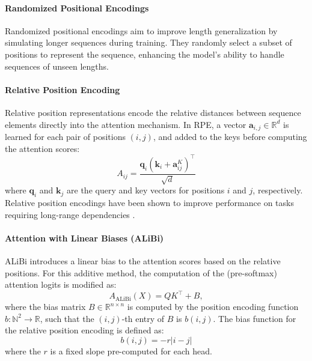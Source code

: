 \paragraph{Randomized Positional Encodings}\label{subsec:random_pos_enc}
Randomized positional encodings \cite{ruoss_randomized_2023} aim to improve length generalization by simulating longer sequences during training. They randomly select a subset of positions to represent the sequence, enhancing the model's ability to handle sequences of unseen lengths.

\paragraph{Relative Position Encoding}\label{subsec:relative_pos_enc}
Relative position representations \parencite{shaw_self-attention_2018} encode the relative distances between sequence elements directly into the attention mechanism. In RPE, a vector $\mathbf{a}_{i, j} \in \mathbb{R}^d$ is learned for each pair of positions $(i, j)$, and added to the keys before computing the attention scores:
\begin{equation*}
    A_{ij} = \frac{\mathbf{q}_i (\mathbf{k}_i + \mathbf{a}_{ij}^K)^\top}{\sqrt{d}}
\end{equation*}
where $\mathbf{q}_i$ and $\mathbf{k}_j$ are the query and key vectors for positions $i$ and $j$, respectively. Relative position encodings have been shown to improve performance on tasks requiring long-range dependencies \parencite{shaw_self-attention_2018}.

\paragraph{Attention with Linear Biases (ALiBi)}\label{subsec:alibi}
ALiBi \parencite{press_train_2021} introduces a linear bias to the attention scores based on the relative positions. For this additive method, the computation of the (pre-softmax) attention logits is modified as:
\begin{equation*}
    A_{\text{ALiBi}}(X) = Q K^\top + B,
\end{equation*}
where the bias matrix $B \in \mathbb{R}^{n \times n}$ is computed by the position encoding function $b : \mathbb{N}^2 \to \mathbb{R}$, such that the $(i,j)$-th entry of $B$ is $b(i,j)$. The bias function for the relative position encoding is defined as:
\begin{equation*}
    b(i,j) = -r|i - j|
\end{equation*}
where the $r$ is a fixed slope pre-computed for each head.

